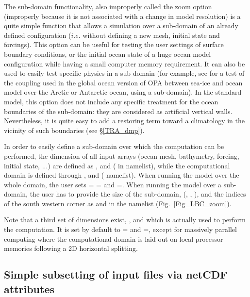 The sub-domain functionality, also improperly called the zoom option 
(improperly because it is not associated with a change in model resolution) 
is a quite simple function that allows a simulation over a sub-domain of an 
already defined configuration ($i.e.$ without defining a new mesh, initial 
state and forcings). This option can be useful for testing the user settings 
of surface boundary conditions, or the initial ocean state of a huge ocean 
model configuration while having a small computer memory requirement. 
It can also be used to easily test specific physics in a sub-domain (for example, 
see \citep{Madec_al_JPO96} for a test of the coupling used in the global ocean 
version of OPA between sea-ice and ocean model over the Arctic or Antarctic 
ocean, using a sub-domain). In the standard model, this option does not 
include any specific treatment for the ocean boundaries of the sub-domain: 
they are considered as artificial vertical walls. Nevertheless, it is quite easy 
to add a restoring term toward a climatology in the vicinity of such boundaries 
(see \S\ref{TRA_dmp}).

In order to easily define a sub-domain over which the computation can be 
performed, the dimension of all input arrays (ocean mesh, bathymetry, 
forcing, initial state, ...) are defined as ,  and  
( in  namelist), while the computational domain is defined through 
,  and  ( namelist). When running the 
model over the whole domain, the user sets = = 
and =. When running the model over a sub-domain, the user 
has to provide the size of the sub-domain, (, , ), 
and the indices of the south western corner as  and  in 
the   namelist (Fig.~\ref{Fig_LBC_zoom}). 

Note that a third set of dimensions exist, ,  and  which is 
actually used to perform the computation. It is set by default to = 
and =, except for massively parallel computing where the 
computational domain is laid out on local processor memories following a 2D 
horizontal splitting. %

\subsection{Simple subsetting of input files via netCDF attributes}


